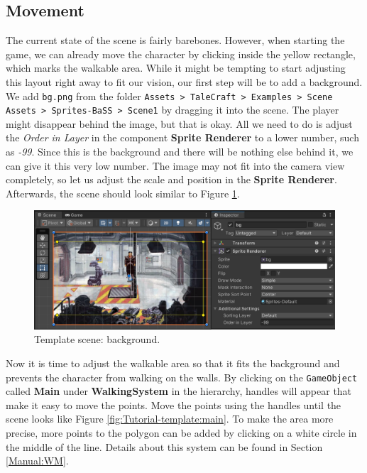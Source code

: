 \subsection{Movement}
The current state of the scene is fairly barebones. However, when starting the game, we can already move the character by clicking inside the yellow rectangle, which marks the walkable area. While it might be tempting to start adjusting this layout right away to fit our vision, our first step will be to add a background.  We add \verb|bg.png|  from the folder \texttt{Assets > TaleCraft > Examples > Scene Assets > Sprites-BaSS > Scene1} by dragging it into the scene. The player might disappear behind the image, but that is okay. All we need to do is adjust the \textit{Order in Layer} in the component \textbf{Sprite Renderer} to a lower number, such as \textit{-99}. Since this is the background and there will be nothing else behind it, we can give it this very low number. The image may not fit into the camera view completely, so let us adjust the scale and position in the \textbf{Sprite Renderer}. Afterwards, the scene should look similar to Figure \ref{fig:Tutorial-template:bg}.
\begin{figure}[H]
\centering
\includegraphics[width=1\linewidth]{img/User doc/image_2025-07-08_104224540.png}
\caption{Template scene: background.}
\label{fig:Tutorial-template:bg}
\end{figure}

Now it is time to adjust the walkable area so that it fits the background and prevents the character from walking on the walls. By clicking on the \verb|GameObject| called \textbf{Main} under \textbf{WalkingSystem} in the hierarchy, handles will appear that make it easy to move the points. Move the points using the handles until the scene looks like Figure \ref{fig:Tutorial-template:main}. To make the area more precise, more points to the polygon can be added by clicking on a white circle in the middle of the line. Details about this system can be found in Section \ref{Manual:WM}.

